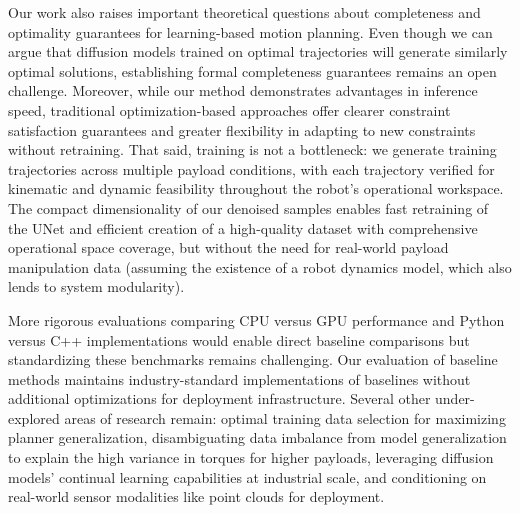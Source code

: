Our work also raises important theoretical questions about completeness and optimality guarantees for learning-based motion planning. Even though we can argue that diffusion models trained on optimal trajectories will generate similarly optimal solutions, establishing formal completeness guarantees remains an open challenge.
Moreover, while our method demonstrates advantages in inference speed, traditional optimization-based approaches offer clearer constraint satisfaction guarantees and greater flexibility in adapting to new constraints without retraining. That said, training is not a bottleneck: we generate training trajectories across multiple payload conditions, with each trajectory verified for kinematic and dynamic feasibility throughout the robot's operational workspace. The compact dimensionality of our denoised samples enables fast retraining of the UNet and efficient creation of a high-quality dataset with comprehensive operational space coverage, but without the need for real-world payload manipulation data (assuming the existence of a robot dynamics model, which also lends to system modularity).

More rigorous evaluations comparing CPU versus GPU performance and Python versus C++ implementations would enable direct baseline comparisons but standardizing these benchmarks remains challenging. Our evaluation of baseline methods maintains industry-standard implementations of baselines without additional optimizations for deployment infrastructure.
Several other under-explored areas of research remain: optimal training data selection for maximizing planner generalization, disambiguating data imbalance from model generalization to explain the high variance in torques for higher payloads, leveraging diffusion models' continual learning capabilities at industrial scale, and conditioning on real-world sensor modalities like point clouds for deployment.